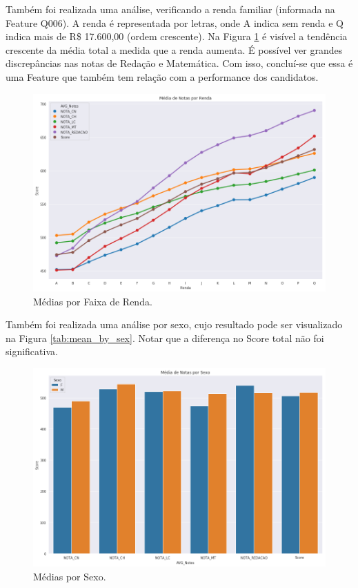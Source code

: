 \documentclass{article}
\begin{document}
Também foi realizada uma análise, verificando a renda familiar (informada na Feature Q006). A renda é representada por letras, onde A indica sem renda e Q indica mais de R\$ 17.600,00 (ordem crescente). Na Figura \ref{fig:mean_by_wage} é visível a tendência crescente da média total a medida que a renda aumenta. É possível ver grandes discrepâncias nas notas de Redação e Matemática. Com isso, concluí-se que essa é uma Feature que também tem relação com a performance dos candidatos.

\begin{figure}[H]
\centering
  \includegraphics[width=0.8 \linewidth]{img/mean_by_wage.png}
  \caption{Médias por Faixa de Renda.}
  \label{fig:mean_by_wage}
\end{figure}

Também foi realizada uma análise por sexo, cujo resultado pode ser visualizado na Figura \ref{tab:mean_by_sex}. Notar que a diferença no Score total não foi significativa.

\begin{figure}[H]
\centering
  \includegraphics[width=0.8 \linewidth]{img/mean_by_sex.png}
  \caption{Médias por Sexo.}
  \label{fig:mean_by_sex}
\end{figure}
\end{document}
